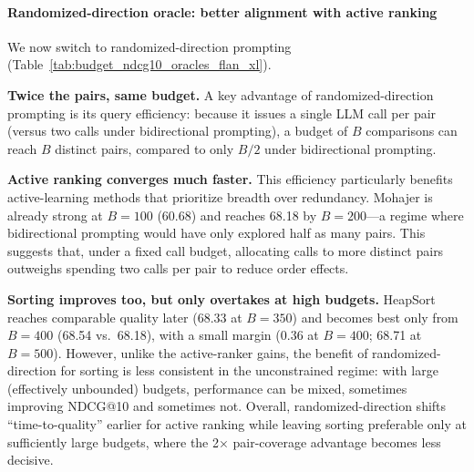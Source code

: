 \documentclass[11pt]{article}
\begin{document}

\paragraph{Randomized-direction oracle: better alignment with active ranking} \label{sec:stochastic-oracle-vs-sorting}

We now switch to randomized-direction prompting (Table~\ref{tab:budget_ndcg10_oracles_flan_xl}).

\noindent\textbf{Twice the pairs, same budget.} A key advantage of randomized-direction prompting is its query efficiency: because it issues a single LLM call per pair (versus two calls under bidirectional prompting), a budget of $B$ comparisons can reach $B$ distinct pairs, compared to only $B/2$ under bidirectional prompting. 

\noindent\textbf{Active ranking converges much faster.} This efficiency particularly benefits active-learning methods that prioritize breadth over redundancy. Mohajer is already strong at $B{=}100$ (60.68) and reaches 68.18 by $B{=}200$—a regime where bidirectional prompting would have only explored half as many pairs. This suggests that, under a fixed call budget, allocating calls to more distinct pairs outweighs spending two calls per pair to reduce order effects.

\noindent\textbf{Sorting improves too, but only overtakes at high budgets.} HeapSort reaches comparable quality later (68.33 at $B{=}350$) and becomes best only from $B{=}400$ (68.54 vs.\ 68.18), with a small margin (0.36 at $B{=}400$; 68.71 at $B{=}500$). However, unlike the active-ranker gains, the benefit of randomized-direction for sorting is less consistent in the unconstrained regime: with large (effectively unbounded) budgets, performance can be mixed, sometimes improving NDCG@10 and sometimes not. Overall, randomized-direction shifts “time-to-quality” earlier for active ranking while leaving sorting preferable only at sufficiently large budgets, where the 2× pair-coverage advantage becomes less decisive. %
\end{document}
